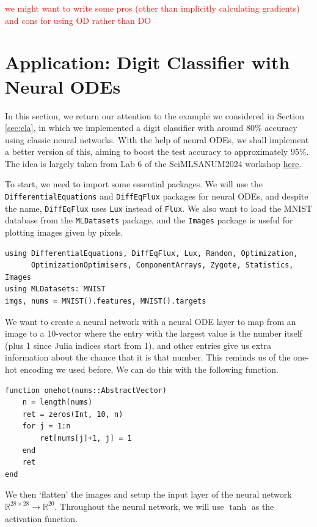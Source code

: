 \documentclass[a4paper,11pt,titlepage]{article}
\theoremstyle{definition}
\theoremstyle{plain}
\theoremstyle{remark}
\begin{document}
\textcolor{red}{we might want to write some pros (other than implicitly calculating gradients) and cons for using OD rather than DO}

\pagebreak
\section{Application: Digit Classifier with Neural ODEs}
\label{sec:app}

In this section, we return our attention to the example we considered in Section \ref{sec:cla}, in which we implemented a digit classifier with around $80\%$ accuracy using classic neural networks. With the help of neural ODEs, we shall implement a better version of this, aiming to boost the test accuracy to approximately $95\%$. The idea is largely taken from Lab 6 of the SciMLSANUM2024 workshop \hyperlink{https://github.com/dlfivefifty/SciMLSANUM2024/blob/main/labs/lab6s.ipynb}{here}.

To start, we need to import some essential packages. We will use the \verb|DifferentialEquations| and \verb|DiffEqFlux| packages for neural ODEs, and despite the name, \verb|DiffEqFlux| uses \verb|Lux| instead of \verb|Flux|. We also want to load the MNIST database from the \verb|MLDatasets| package, and the \verb|Images| package is useful for plotting images given by pixels.

\begin{verbatim}
using DifferentialEquations, DiffEqFlux, Lux, Random, Optimization,
      OptimizationOptimisers, ComponentArrays, Zygote, Statistics, Images
using MLDatasets: MNIST
imgs, nums = MNIST().features, MNIST().targets
\end{verbatim}

We want to create a neural network with a neural ODE layer to map from an image to a 10-vector where the entry with the largest value is the number itself (plus 1 since Julia indices start from 1), and other entries give us extra information about the chance that it is that number. This reminds us of the one-hot encoding we used before. We can do this with the following function.

\begin{verbatim}
function onehot(nums::AbstractVector)
    n = length(nums)
    ret = zeros(Int, 10, n)
    for j = 1:n
        ret[nums[j]+1, j] = 1
    end
    ret
end
\end{verbatim}

We then ‘flatten’ the images and setup the input layer of the neural network $\mathbb{R}^{28\times28}\rightarrow\mathbb{R}^{20}$. Throughout the neural network, we will use $\tanh$ as the activation function.
\end{document}
